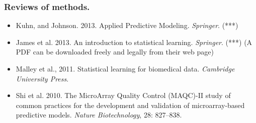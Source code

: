 \begin{frame}
\frametitle{Reviews of methods.}
\begin{itemize}
  
  \item Kuhn, and Johnson. 2013. Applied Predictive
    Modeling. \textit{Springer}. (***)
  \item James et al. 2013. An introduction to statistical
    learning. \textit{Springer}. (***) {\footnotesize (A PDF can be downloaded freely and
    legally from their web page)}

  \item Malley et al., 2011. Statistical learning for biomedical
    data. \textit{Cambridge University Press}.
    
\item Shi et al. 2010. The MicroArray Quality Control (MAQC)-II study of
  common practices for the development and validation of microarray-based
  predictive models. \textit{Nature Biotechnology}, 28: 827--838.

  

  
  
  
\end{itemize}
\end{frame}





